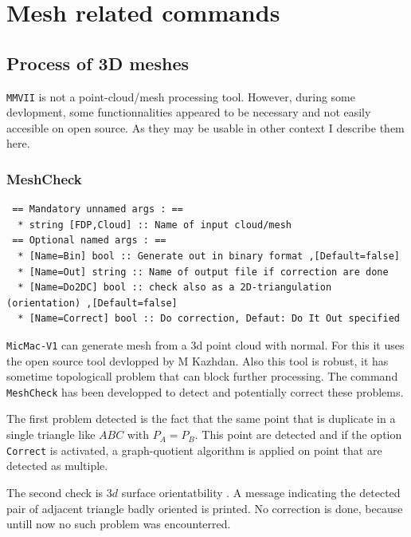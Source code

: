 \chapter{Mesh related commands}
\label{Chap:Mesh}



\section{Process of 3D meshes}

 {\tt MMVII} is not a point-cloud/mesh processing tool. However, during some devlopment, some
functionnalities appeared to be necessary and not easily accesible on open source.
As they may be usable in other context I describe them here.

\subsection{MeshCheck}

\begin{verbatim}
 == Mandatory unnamed args : ==
  * string [FDP,Cloud] :: Name of input cloud/mesh
 == Optional named args : ==
  * [Name=Bin] bool :: Generate out in binary format ,[Default=false]
  * [Name=Out] string :: Name of output file if correction are done
  * [Name=Do2DC] bool :: check also as a 2D-triangulation (orientation) ,[Default=false]
  * [Name=Correct] bool :: Do correction, Defaut: Do It Out specified
\end{verbatim}

{\tt MicMac-V1} can generate mesh from a 3d point cloud with normal. For this it
uses the open source tool devlopped by M Kazhdan. Also this tool is robust,
it has sometime topologicall problem that can block further processing.
The command {\tt MeshCheck} has been developped to  detect and potentially
correct these problems.

The first problem detected   is the fact that the same point that is duplicate in
a single triangle  like $ABC$  with $P_A=P_B$. This point are detected and
if the option {\tt Correct} is activated, a graph-quotient algorithm is applied 
on point that are detected as multiple.

The second check is $3d$ surface orientatbility . A message indicating the detected
pair of adjacent triangle badly oriented is printed.  No correction is
done, because untill now no such problem was encounterred.

